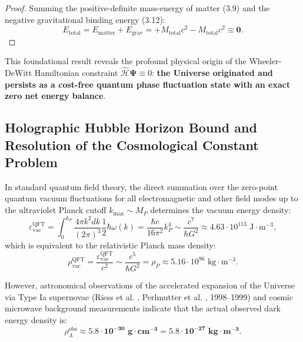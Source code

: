\documentclass[11pt,a4paper]{article}
\theoremstyle{definition}
\begin{document}
\begin{proof}
Summing the positive-definite mass-energy of matter (3.9) and the negative gravitational binding energy (3.12):
\begin{equation}\label{eq:3.13}\tag{3.13}
E_{\text{total}} = E_{\text{matter}} + E_{\text{grav}} = +M_{\text{total}} c^2 - M_{\text{total}} c^2 \equiv \mathbf{0}.
\end{equation}
\end{proof}

This foundational result reveals the profound physical origin of the Wheeler-DeWitt Hamiltonian constraint $\hat{\mathcal{H}} \mathbf{\Psi} \equiv 0$: \textbf{the Universe originated and persists as a cost-free quantum phase fluctuation state with an exact zero net energy balance}.

\subsection{Holographic Hubble Horizon Bound and Resolution of the Cosmological Constant Problem}\label{sec:3.3}

In standard quantum field theory, the direct summation over the zero-point quantum vacuum fluctuations for all electromagnetic and other field modes up to the ultraviolet Planck cutoff $k_{\max} \sim M_P$ determines the vacuum energy density:
\begin{equation}\label{eq:3.14}\tag{3.14}
\varepsilon_{\text{vac}}^{\text{QFT}} = \int_0^{k_P} \frac{4\pi k^2 dk}{(2\pi)^3} \frac{1}{2}\hbar \omega(k) = \frac{\hbar c}{16\pi^2} k_P^4 \sim \frac{c^7}{\hbar G^2} \approx 4.63 \cdot 10^{113}\text{ J}\cdot\text{m}^{-3},
\end{equation}
which is equivalent to the relativistic Planck mass density:
\begin{equation}\label{eq:3.15}\tag{3.15}
\rho_{\text{vac}}^{\text{QFT}} = \frac{\varepsilon_{\text{vac}}^{\text{QFT}}}{c^2} \sim \frac{c^5}{\hbar G^2} = \rho_P \approx 5.16 \cdot 10^{96}\text{ kg}\cdot\text{m}^{-3}.
\end{equation}

However, astronomical observations of the accelerated expansion of the Universe via Type Ia supernovae (Riess et al. \cite{ref21}, Perlmutter et al. \cite{ref22}, 1998--1999) and cosmic microwave background measurements indicate that the actual observed dark energy density is:
\begin{equation}\label{eq:3.16}\tag{3.16}
\rho_{\Lambda}^{\text{obs}} \approx \mathbf{5.8 \cdot 10^{-30}\text{ g}\cdot\text{cm}^{-3}} = \mathbf{5.8 \cdot 10^{-27}\text{ kg}\cdot\text{m}^{-3}}.
\end{equation}
\end{document}
